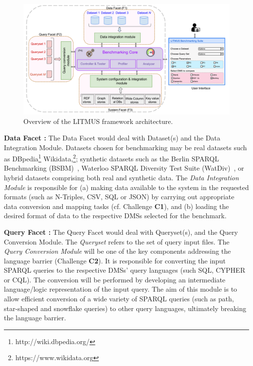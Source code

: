 \documentclass{llncs}
\begin{document}
        \begin{figure}[h]
            \centering
            \includegraphics[scale=0.14]{images/architecture.png}
            \caption{Overview of the LITMUS framework architecture.}
            \label{fig:benchmark_arch}
        \end{figure}
        
        \textbf{Data Facet :} The Data Facet would deal with Dataset(s) and the Data Integration Module.
        Datasets chosen for benchmarking may be real datasets such as DBpedia\footnote{http://wiki.dbpedia.org/} Wikidata,\footnote{https://www.wikidata.org}; synthetic datasets such as the Berlin SPARQL Benchmarking (BSBM)~\cite{Bizer2009TheBS}, Waterloo SPARQL Diversity Test Suite (WatDiv)~\cite{alucc2014diversified}, or hybrid datasets comprising both real and synthetic data. 
        The \textit{Data Integration Module} is responsible for (a) making data available to the system in the requested formats (such as N-Triples, CSV, SQL or JSON) by carrying out appropriate data conversion and mapping tasks (cf. Challenge \textbf{C1}), and (b) loading the desired format of data to the respective DMSs selected for the benchmark. 
        
        \textbf{Query Facet :} The Query Facet would deal with Queryset(s), and the Query Conversion Module. The \textit{Queryset} refers to the set of query input files. The \textit{Query Conversion Module} will be one of the key components addressing the language barrier (Challenge \textbf{C2}). It is responsible for converting the input SPARQL queries to the respective DMSs' query languages (such SQL, CYPHER or CQL).
        The conversion will be performed by developing an intermediate language/logic representation of the input query.
        The aim of this module is to allow efficient conversion of a wide variety of SPARQL queries (such as path, star-shaped and snowflake queries) to other query languages, ultimately breaking the language barrier.
        
\end{document}

